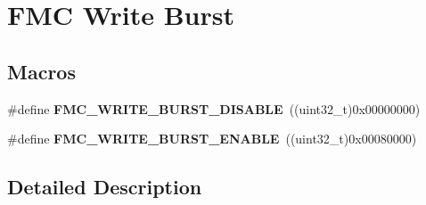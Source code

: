 \hypertarget{group___f_m_c___write___burst}{}\section{F\+MC Write Burst}
\label{group___f_m_c___write___burst}
\subsection*{Macros}
\begin{DoxyCompactItemize}
\item 
\#define {\bfseries F\+M\+C\+\_\+\+W\+R\+I\+T\+E\+\_\+\+B\+U\+R\+S\+T\+\_\+\+D\+I\+S\+A\+B\+LE}~((uint32\+\_\+t)0x00000000)\hypertarget{group___f_m_c___write___burst_ga7e1852380a805bd6bf4fbea04c4a337a}{}\label{group___f_m_c___write___burst_ga7e1852380a805bd6bf4fbea04c4a337a}

\item 
\#define {\bfseries F\+M\+C\+\_\+\+W\+R\+I\+T\+E\+\_\+\+B\+U\+R\+S\+T\+\_\+\+E\+N\+A\+B\+LE}~((uint32\+\_\+t)0x00080000)\hypertarget{group___f_m_c___write___burst_ga64927bd92465fbab6bcae780ebdf62ad}{}\label{group___f_m_c___write___burst_ga64927bd92465fbab6bcae780ebdf62ad}

\end{DoxyCompactItemize}


\subsection{Detailed Description}
